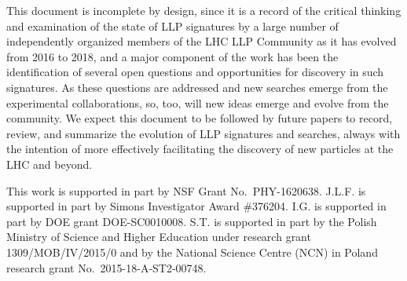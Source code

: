 This document is incomplete by design, since it is a record of the critical thinking and examination of the state of LLP signatures by a large number of independently organized members of the LHC LLP Community as it has evolved from 2016 to 2018, and a major component of the work has been the identification of several open questions and opportunities for discovery in such signatures.
As these questions are addressed and new searches emerge from the experimental collaborations, so, too, will new ideas emerge and evolve from the community.
We expect this document to be followed by future papers to record, review, and summarize the evolution of LLP signatures and searches, always with the intention of more effectively facilitating the discovery of new particles at the LHC and beyond. \\

\vspace{\baselineskip}


\vspace{\baselineskip}

\noindent This work is supported in part by NSF Grant No.~PHY-1620638. 
J.L.F. is supported in part by Simons Investigator Award \#376204.  
I.G. is supported in part by DOE grant DOE-SC0010008. 
S.T. is supported in part by the Polish Ministry of Science and Higher Education under research grant 1309/MOB/IV/2015/0 and by the National Science Centre (NCN) in Poland research grant No.\ 2015-18-A-ST2-00748.  

